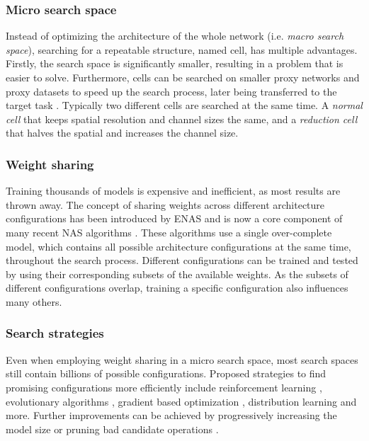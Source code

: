 \documentclass[conference]{IEEEtran}
\begin{document}
\subsubsection*{Micro search space}
\label{sss_rel_micro}

Instead of optimizing the architecture of the whole network (i.e. \textit{macro search space}), searching for a repeatable structure, named cell, has multiple advantages.
Firstly, the search space is significantly smaller, resulting in a problem that is easier to solve.
Furthermore, cells can be searched on smaller proxy networks and proxy datasets to speed up the search process, later being transferred to the target task \cite{nas_evo, nas_trans, nas_prog, nas_enas, nas_darts, nas_sharp, nas_mde, nas_asap, nas_pdarts}.
Typically two different cells are searched at the same time. A \textit{normal cell} that keeps spatial resolution and channel sizes the same, and a \textit{reduction cell} that halves the spatial and increases the channel size.



\subsubsection*{Weight sharing}
\label{sss_rel_weightsharing}

Training thousands of models \cite{nas, nas_trans, nas_evo, nas_prog} is expensive and inefficient, as most results are thrown away.
The concept of sharing weights across different architecture configurations has been introduced by ENAS \cite{nas_enas} and is now a core component of many recent NAS algorithms \cite{nas_enas, nas_darts, nas_sharp, nas_mde, nas_asap, nas_pdarts}.
These algorithms use a single over-complete model,
which contains all possible architecture configurations at the same time,
throughout the search process.
Different configurations can be trained and tested by using their corresponding subsets of the available weights. As the subsets of different configurations overlap, training a specific configuration also influences many others.



\subsubsection*{Search strategies}
\label{sss_rel_searchstrategy}

Even when employing weight sharing in a micro search space, most search spaces still contain billions of possible configurations. Proposed strategies to find promising configurations more efficiently include reinforcement learning \cite{nas, nas_trans, nas_enas}, evolutionary algorithms \cite{nas_evo}, gradient based optimization \cite{nas_darts, nas_asap, nas_sharp, nas_pdarts}, distribution learning \cite{nas_mde} and more.
Further improvements can be achieved by progressively increasing the model size \cite{nas_prog, nas_pdarts} or pruning bad candidate operations \cite{nas_asap}.
\end{document}
